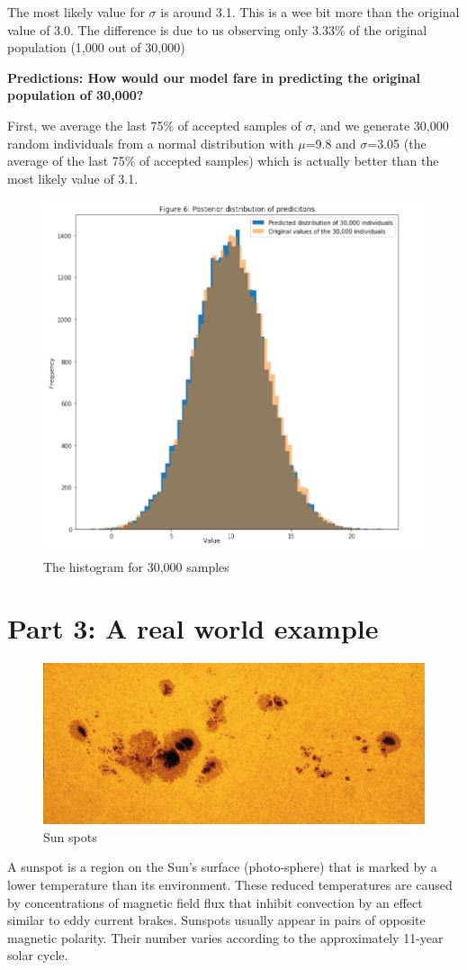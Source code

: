 The most likely value for $\sigma$ is around 3.1. This is a wee bit more than the original value of 3.0. The difference is due to us observing only 3.33\% of the original population (1,000 out of 30,000)

\textbf{Predictions: How would our model fare in predicting the original population of 30,000?}

First, we average the last 75\% of accepted samples of $\sigma$, and we generate 30,000 random individuals from a normal distribution with  $\mu$=9.8 and $\sigma$=3.05 (the average of the last 75\% of accepted samples) which is actually better than the most likely value of 3.1.

\begin{figure}[h]
    \centering
\includegraphics[width=.6\textwidth]{pic/p05c09-snip05}
    \caption{The histogram for 30,000 samples}
    \label{fig:p05c09-snip05}
\end{figure}

\section{Part 3: A real world example}

\begin{figure}[h]
    \centering
\includegraphics[width=.6\textwidth]{pic/p05c09-snip06}
    \caption{Sun spots}
    \label{fig:p05c09-snip06}
\end{figure}

A sunspot is a region on the Sun's surface (photo-sphere) that is marked by a lower temperature than its environment. These reduced temperatures are caused by concentrations of magnetic field flux that inhibit convection by an effect similar to eddy current brakes. Sunspots usually appear in pairs of opposite magnetic polarity. Their number varies according to the approximately 11-year solar cycle.

